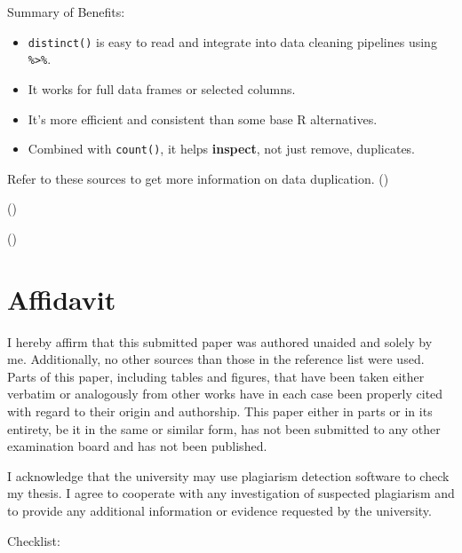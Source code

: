 \documentclass[
  man,
  floatsintext,
  longtable,
  nolmodern,
  notxfonts,
  notimes,
  colorlinks=true,linkcolor=blue,citecolor=blue,urlcolor=blue]{apa7}
\providecommand{\tightlist}{%
  \setlength{\itemsep}{0pt}\setlength{\parskip}{0pt}}
\begin{document}
Summary of Benefits:

\begin{itemize}
\tightlist
\item
  \texttt{distinct()} is easy to read and integrate into data cleaning
  pipelines using \texttt{\%\textgreater{}\%}.
\item
  It works for full data frames or selected columns.
\item
  It's more efficient and consistent than some base R alternatives.
\item
  Combined with \texttt{count()}, it helps \textbf{inspect}, not just
  remove, duplicates.
\end{itemize}

Refer to these sources to get more information on data duplication.
()

()

()

\section{Affidavit}\label{affidavit}

I hereby affirm that this submitted paper was authored unaided and
solely by me. Additionally, no other sources than those in the reference
list were used. Parts of this paper, including tables and figures, that
have been taken either verbatim or analogously from other works have in
each case been properly cited with regard to their origin and
authorship. This paper either in parts or in its entirety, be it in the
same or similar form, has not been submitted to any other examination
board and has not been published.

I acknowledge that the university may use plagiarism detection software
to check my thesis. I agree to cooperate with any investigation of
suspected plagiarism and to provide any additional information or
evidence requested by the university.

Checklist:
\end{document}
